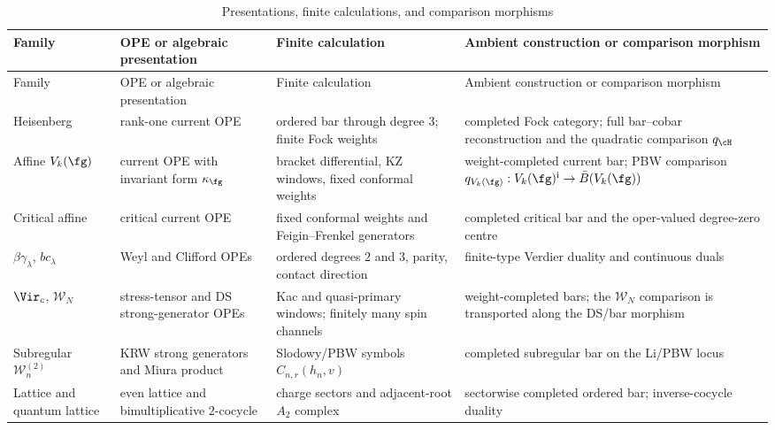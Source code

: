 {\scriptsize
\renewcommand{\arraystretch}{1.18}
\begin{longtable}{@{}p{}p{}p{}p{}@{}}
\caption{Presentations, finite calculations, and comparison morphisms}
\label{tab:standard-family-ambient}\\
\toprule
Family & OPE or algebraic presentation & Finite calculation &
Ambient construction or comparison morphism \\
\midrule
\endfirsthead
\toprule
Family & OPE or algebraic presentation & Finite calculation &
Ambient construction or comparison morphism \\
\midrule
\endhead
Heisenberg &
rank-one current OPE &
ordered bar through degree \(3\); finite Fock weights &
completed Fock category; full bar--cobar reconstruction and the
quadratic comparison \(q_{\cH}\) \\

Affine \(V_k(\fg)\) &
current OPE with invariant form \(\kappa_\fg\) &
bracket differential, KZ windows, fixed conformal weights &
weight-completed current bar; PBW comparison
\(q_{V_k(\fg)}:V_k(\fg)^{\mathrm i}\to\bar B(V_k(\fg))\) \\

Critical affine &
critical current OPE &
fixed conformal weights and Feigin--Frenkel generators &
completed critical bar and the oper-valued degree-zero centre \\

\(\beta\gamma_\lambda\), \(bc_\lambda\) &
Weyl and Clifford OPEs &
ordered degrees \(2\) and \(3\), parity, contact direction &
finite-type Verdier duality and continuous duals \\

\(\Vir_c\), \(\mathcal W_N\) &
stress-tensor and DS strong-generator OPEs &
Kac and quasi-primary windows; finitely many spin channels &
weight-completed bars; the \(\mathcal W_N\) comparison is transported
along the DS/bar morphism \\

Subregular \(\mathcal W_n^{(2)}\) &
KRW strong generators and Miura product &
Slodowy/PBW symbols \(C_{n,r}(h_n,v)\) &
completed subregular bar on the Li/PBW locus \\

Lattice and quantum lattice &
even lattice and bimultiplicative \(2\)-cocycle &
charge sectors and adjacent-root \(A_2\) complex &
sectorwise completed ordered bar; inverse-cocycle duality \\


\end{longtable}}
